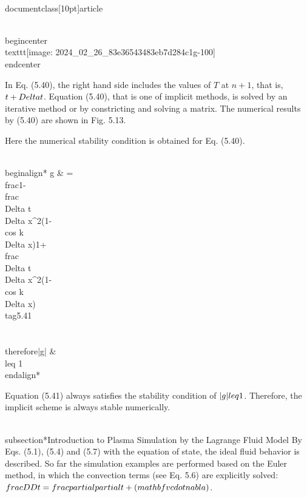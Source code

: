\\documentclass[10pt]{article}
\begin{document}
{\\begin{center}
\\texttt{[image: 2024\_02\_26\_83e36543483eb7d284c1g-100]}
\\end{center}

In Eq. (5.40), the right hand side includes the values of $T$ at $n+1$, that is, $t+\\Delta t$. Equation (5.40), that is one of implicit methods, is solved by an iterative method or by constricting and solving a matrix. The numerical results by (5.40) are shown in Fig. 5.13.

Here the numerical stability condition is obtained for Eq. (5.40).


\\begin{align*}
g & =\\frac{1-\\frac{\\Delta t}{\\Delta x^{2}}(1-\\cos k \\Delta x)}{1+\\frac{\\Delta t}{\\Delta x^{2}}(1-\\cos k \\Delta x)}  \\tag{5.41}\\\\
\\therefore|g| & \\leq 1
\\end{align*}


Equation (5.41) always satisfies the stability condition of $|g| \\leq 1$. Therefore, the implicit scheme is always stable numerically.

\\subsection*{Introduction to Plasma Simulation by the Lagrange Fluid Model}
By Eqs. (5.1), (5.4) and (5.7) with the equation of state, the ideal fluid behavior is described. So far the simulation examples are performed based on the Euler method, in which the convection terms (see Eq. 5.6) are explicitly solved: $\\frac{D}{D t}=\\frac{\\partial}{\\partial t}+(\\mathbf{v} \\cdot \\nabla)$.

}
\end{document}
